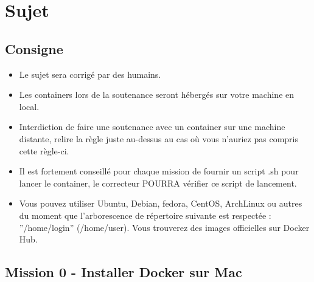\documentclass{42}
\begin{document}
	\newpage

\chapter{Sujet}

\section{Consigne}
\begin{itemize}
	\item Le sujet sera corrigé par des humains.
	\item Les containers lors de la soutenance seront hébergés sur votre machine en local.
	\item Interdiction de faire une soutenance avec un container sur une machine distante, relire la règle juste au-dessus au cas où vous n’auriez pas compris cette règle-ci.
	\item Il est fortement conseillé pour chaque mission de fournir un script .sh pour lancer le container, le correcteur POURRA vérifier ce script de lancement.
	\item Vous pouvez utiliser Ubuntu, Debian, fedora, CentOS, ArchLinux ou autres du moment que l'arborescence de répertoire suivante est respectée : ''/home/login'' (/home/user). Vous trouverez des images officielles sur Docker Hub.
\end{itemize}

	\newpage

\section{Mission 0 - Installer Docker sur Mac}
\end{document}
